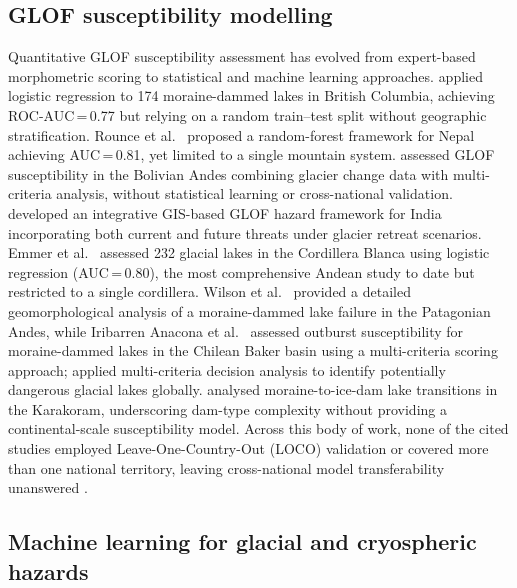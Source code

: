 \documentclass[pdflatex,sn-basic]{sn-jnl}%
\begin{document}
\subsection{GLOF susceptibility modelling}

Quantitative GLOF susceptibility assessment has evolved from
expert-based morphometric scoring \citep{McKillop2007,Emmer2016,Richardson2000} to
statistical and machine learning approaches. \citet{McKillop2007} applied logistic regression to 174 moraine-dammed
lakes in British Columbia, achieving ROC-AUC\,=\,0.77 but relying on a
random train--test split without geographic stratification. Rounce et
al.\ \citep{Rounce2017} proposed a random-forest framework for Nepal
achieving AUC\,=\,0.81, yet limited to a single mountain system.
\citet{Cook2016} assessed GLOF susceptibility in the
Bolivian Andes combining glacier change data with multi-criteria
analysis, without statistical learning or cross-national validation.
\citet{Allen2016} developed an integrative GIS-based
GLOF hazard framework for India incorporating both current and future
threats under glacier retreat scenarios. Emmer
et al.\ \citep{Emmer2020} assessed 232 glacial lakes in the Cordillera
Blanca using logistic regression (AUC\,=\,0.80), the most comprehensive
Andean study to date but restricted to a single cordillera. Wilson et
al.\ \citep{Wilson2018} provided a detailed geomorphological analysis of
a moraine-dammed lake failure in the Patagonian Andes, while Iribarren
Anacona et al.\ \citep{IribarrenAnacona2014} assessed outburst
susceptibility for moraine-dammed lakes in the Chilean Baker basin
using a multi-criteria scoring approach; \citet{Kougkoulos2018} applied multi-criteria decision analysis to
identify potentially dangerous glacial lakes globally. \citet{Sattar2022} analysed moraine-to-ice-dam lake transitions in the
Karakoram, underscoring dam-type complexity without providing a
continental-scale susceptibility model. Across this body of work, none
of the cited studies employed Leave-One-Country-Out (LOCO) validation
or covered more than one national territory, leaving cross-national
model transferability unanswered \citep{Pronk2022}.

\subsection{Machine learning for glacial and cryospheric hazards}
\end{document}
